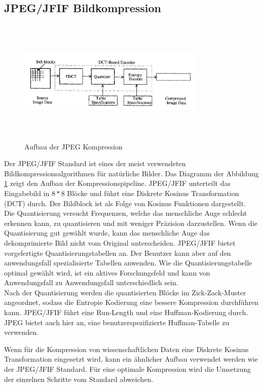 \subsection{JPEG/JFIF Bildkompression}
\begin{figure}[!htbp]
	\center
	\includegraphics[width=0.8\textwidth,height=6cm,keepaspectratio]{./pictures/state/jpeg.png}
	\caption{Aufbau der JPEG Kompression \cite{wallace1992jpeg}}
	\label{state:jpeg:abb}
\end{figure}
Der JPEG/JFIF Standard ist eines der meist verwendeten Bildkompressionsalgorithmen für natürliche Bilder. Das Diagramm der Abbildung \ref{state:jpeg:abb} zeigt den Aufbau der Kompressionspipeline. JPEG/JFIF unterteilt das Eingabebild in $8*8$ Blöcke und führt eine Diskrete Kosinus Transformation (DCT) durch. Der Bildblock ist als Folge von Kosinus Funktionen dargestellt.\\
Die Quantisierung versucht Frequenzen, welche das menschliche Auge schlecht erkennen kann, zu quantisieren und mit weniger Präzision darzustellen. Wenn die Quantisierung gut gewählt wurde, kann das menschliche Auge das dekomprimierte Bild nicht vom Original unterscheiden. JPEG/JFIF bietet vorgefertigte Quantisierungstabellen an. Der Benutzer kann aber auf den anwendungsfall spezialisierte Tabellen anwenden. Wie die Quantisierungstabelle optimal gewählt wird, ist ein aktives Forschungsfeld \cite{wu1993rate:jpeg} \cite{wang2001designing:jpeg} und kann von Anwendungsfall zu Anwendungsfall unterschiedlich sein.\\
Nach der Quantisierung werden die quantisierten Blöcke im Zick-Zack-Muster angeordnet, sodass die Entropie Kodierung eine bessere Kompression durchführen kann. JPEG/JFIF führt eine Run-Length\cite{wiki:rle} und eine Huffman-Kodierung\cite{huffman1952method} durch. JPEG bietet auch hier an, eine benutzerspezifizierte Huffman-Tabelle zu verwenden.

Wenn für die Kompression von wissenschaftlichen Daten eine Diskrete Kosinus Transformation eingesetzt wird, kann ein ähnlicher Aufbau verwendet werden wie der JPEG/JFIF Standard. Für eine optimale Kompression wird die Umsetzung der einzelnen Schritte vom Standard abweichen.

